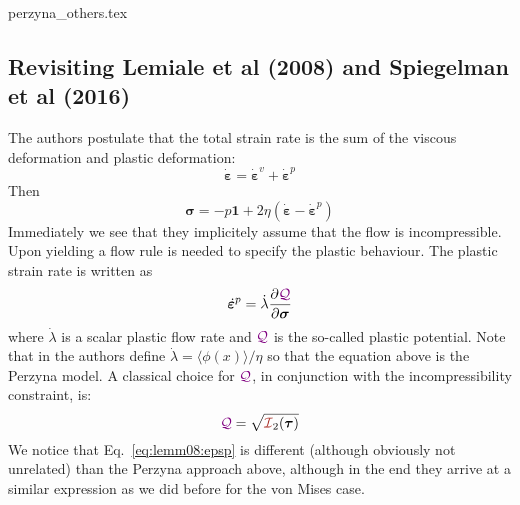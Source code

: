 \begin{flushright} {\tiny {\color{gray} perzyna\_others.tex}} \end{flushright}

\subsection{Revisiting Lemiale et al (2008) and Spiegelman et al (2016) }
The authors postulate that the total strain rate is the sum of 
the viscous deformation and plastic deformation:
\[
\dot{\bm \varepsilon} = \dot{\bm \varepsilon}^v + \dot{\bm \varepsilon}^p
\]
Then 
\begin{equation}
\bm \sigma = -p \bm 1 + 2\eta (\dot{\bm \varepsilon} -\dot{\bm \varepsilon}^p)
\label{eq:abcd}
\end{equation}
Immediately we see that they implicitely assume that the flow is incompressible.
Upon yielding a flow rule is needed to specify the plastic 
behaviour. The plastic strain rate is written as
\begin{equation}
\label{eq:lemm08:epsp}
\dot{\bm \varepsilon}^p = \dot\lambda \frac{\partial {\color{violet}\cal Q}}{\partial \bm\sigma}
\end{equation}
where $\dot\lambda$ is a scalar plastic flow rate and ${\color{violet}\cal Q}$ is the so-called plastic potential. 
Note that in \textcite{hesd02} the authors define $\dot{\lambda}=\langle \phi(x) \rangle/\eta$
so that the equation above is the Perzyna model. 
A classical choice for ${\color{violet}\cal Q}$, in conjunction with the incompressibility constraint, is:
\[
\QQQ = \sqrt{ {\III}_2(\bm\tau)}
\]
We notice that Eq.~\ref{eq:lemm08:epsp} is different (although obviously not unrelated) 
than the Perzyna approach above, although
in the end they arrive at a similar expression as we did before for the von Mises case.


